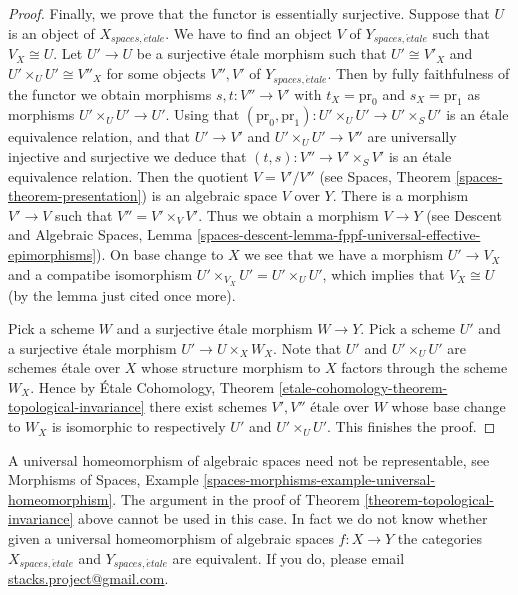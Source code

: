 \begin{proof}
\medskip\noindent
Finally, we prove that the functor is essentially surjective.
Suppose that $U$ is an object of $X_{spaces, \acute{e}tale}$.
We have to find an object $V$ of $Y_{spaces, \acute{e}tale}$
such that $V_X \cong U$. Let $U' \to U$ be a surjective \'etale morphism
such that $U' \cong V'_X$ and $U' \times_U U' \cong V''_X$
for some objects $V'', V'$ of $Y_{spaces, \acute{e}tale}$.
Then by fully faithfulness of the functor we obtain morphisms
$s, t : V'' \to V'$ with $t_X = \text{pr}_0$ and $s_X = \text{pr}_1$
as morphisms $U' \times_U U' \to U'$. Using that
$(\text{pr}_0, \text{pr}_1) : U' \times_U U' \to U' \times_S U'$
is an \'etale equivalence relation, and that $U' \to V'$ and
$U' \times_U U' \to V''$ are universally injective and surjective
we deduce that
$(t, s) : V'' \to V' \times_S V'$ is an \'etale equivalence relation.
Then the quotient $V = V'/V''$ (see
Spaces, Theorem \ref{spaces-theorem-presentation})
is an algebraic space $V$ over $Y$. There is a morphism
$V' \to V$ such that $V'' = V' \times_V V'$. Thus we obtain a morphism
$V \to Y$ (see
Descent and Algebraic Spaces,
Lemma \ref{spaces-descent-lemma-fppf-universal-effective-epimorphisms}).
On base change to $X$ we see that we have a morphism $U' \to V_X$
and a compatibe isomorphism $U' \times_{V_X} U' = U' \times_U U'$, which
implies that $V_X \cong U$ (by the lemma just cited once more).

\medskip\noindent
Pick a scheme $W$ and a surjective \'etale morphism $W \to Y$.
Pick a scheme $U'$ and a surjective \'etale morphism $U' \to U \times_X W_X$.
Note that $U'$ and $U' \times_U U'$ are schemes \'etale over $X$ whose
structure morphism to $X$ factors through the scheme $W_X$.
Hence by
\'Etale Cohomology,
Theorem \ref{etale-cohomology-theorem-topological-invariance}
there exist schemes $V', V''$ \'etale over $W$ whose base change to
$W_X$ is isomorphic to respectively $U'$ and $U' \times_U U'$.
This finishes the proof.
\end{proof}

\begin{remark}
\label{remark-topological-invariance-etale-site}
A universal homeomorphism of algebraic spaces need not be representable, see
Morphisms of Spaces,
Example \ref{spaces-morphisms-example-universal-homeomorphism}.
The argument in the proof of
Theorem \ref{theorem-topological-invariance}
above cannot be used in this case. In fact we do not know whether given
a universal homeomorphism of algebraic spaces
$f : X \to Y$ the categories $X_{spaces, \acute{e}tale}$
and $Y_{spaces, \acute{e}tale}$ are equivalent.
If you do, please email
\href{mailto:stacks.project@gmail.com}{stacks.project@gmail.com}.
\end{remark}








